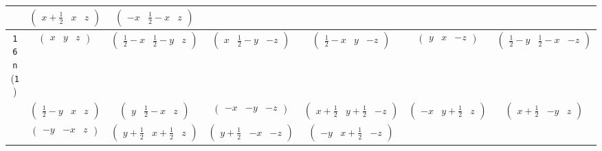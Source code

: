 \documentclass[fleqn,9pt,landscape]{jsarticle}
\begin{document}
\begin{center}
\begin{longtable}{ccccccc}
& $ \begin{pmatrix} x + \frac{1}{2} & x & z \end{pmatrix} $ & $ \begin{pmatrix} - x & \frac{1}{2} - x & z \end{pmatrix} $ & $  $ & $  $ & $  $ & $  $ \\ \hline
{\tt 16n} ({\tt 1}) & $ \begin{pmatrix} x & y & z \end{pmatrix} $ & $ \begin{pmatrix} \frac{1}{2} - x & \frac{1}{2} - y & z \end{pmatrix} $ & $ \begin{pmatrix} x & \frac{1}{2} - y & - z \end{pmatrix} $ & $ \begin{pmatrix} \frac{1}{2} - x & y & - z \end{pmatrix} $ & $ \begin{pmatrix} y & x & - z \end{pmatrix} $ & $ \begin{pmatrix} \frac{1}{2} - y & \frac{1}{2} - x & - z \end{pmatrix} $ \\
& $ \begin{pmatrix} \frac{1}{2} - y & x & z \end{pmatrix} $ & $ \begin{pmatrix} y & \frac{1}{2} - x & z \end{pmatrix} $ & $ \begin{pmatrix} - x & - y & - z \end{pmatrix} $ & $ \begin{pmatrix} x + \frac{1}{2} & y + \frac{1}{2} & - z \end{pmatrix} $ & $ \begin{pmatrix} - x & y + \frac{1}{2} & z \end{pmatrix} $ & $ \begin{pmatrix} x + \frac{1}{2} & - y & z \end{pmatrix} $ \\
& $ \begin{pmatrix} - y & - x & z \end{pmatrix} $ & $ \begin{pmatrix} y + \frac{1}{2} & x + \frac{1}{2} & z \end{pmatrix} $ & $ \begin{pmatrix} y + \frac{1}{2} & - x & - z \end{pmatrix} $ & $ \begin{pmatrix} - y & x + \frac{1}{2} & - z \end{pmatrix} $ & $  $ & $  $ \\
\end{longtable}
\end{center}
\end{document}
